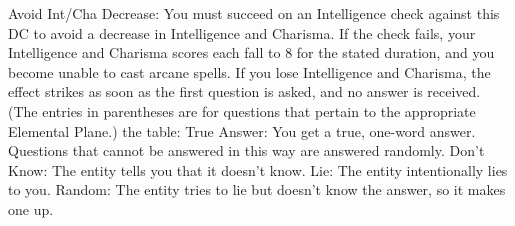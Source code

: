 Avoid Int/Cha Decrease: You must succeed on an Intelligence check against
this DC to avoid a decrease in Intelligence and Charisma. If the check fails, your
Intelligence and Charisma scores each fall to 8 for the stated duration, and you
become unable to cast arcane spells. If you lose Intelligence and Charisma, the
effect strikes as soon as the first question is asked, and no answer is received.
(The entries in parentheses are for questions that pertain to the appropriate Elemental
Plane.)
the table:
True Answer: You get a true, one-word answer. Questions that cannot be
answered in this way are answered randomly.
Don't Know: The entity tells you that it doesn't know.
Lie: The entity intentionally lies to you.
Random: The entity tries to lie but doesn't know the answer, so
it makes one up.